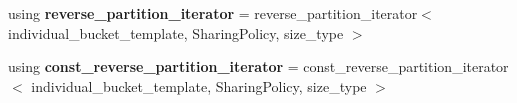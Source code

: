 \begin{DoxyCompactItemize}
\mbox{\label{classsequoia_1_1data__structures_1_1bucketed__storage_ae1cc3620938cff0aaa4462b00bfbdaed}} 
using {\bfseries reverse\+\_\+partition\+\_\+iterator} = reverse\+\_\+partition\+\_\+iterator$<$ individual\+\_\+bucket\+\_\+template, Sharing\+Policy, size\+\_\+type $>$
\item 
\mbox{\label{classsequoia_1_1data__structures_1_1bucketed__storage_a5905f618d75869306ef77a42bf250033}} 
using {\bfseries const\+\_\+reverse\+\_\+partition\+\_\+iterator} = const\+\_\+reverse\+\_\+partition\+\_\+iterator$<$ individual\+\_\+bucket\+\_\+template, Sharing\+Policy, size\+\_\+type $>$
\end{DoxyCompactItemize}
